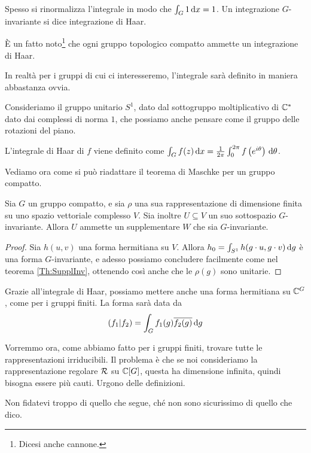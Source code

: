 	Spesso si rinormalizza l'integrale in modo che $\int_{G} 1 \, \textrm{d} x=1$. Un integrazione $G$-invariante si dice integrazione di Haar.
	
	\`E un fatto noto\footnote{Dicesi anche cannone.} che ogni gruppo topologico compatto ammette un integrazione di Haar.
	
	In realtà per i gruppi di cui ci interesseremo, l'integrale sarà definito in maniera abbastanza ovvia.
	
	\begin{myexample}
		Consideriamo il gruppo unitario $S^1$, dato dal sottogruppo moltiplicativo di $\mathbb C^*$ dato dai complessi di norma $1$, che possiamo anche pensare come il gruppo delle rotazioni del piano.
		
		L'integrale di Haar di $f$ viene definito come $\int_{G} f(z) \, \textrm{d} x = \frac1{2\pi}\int_0^{2\pi} f\left(e^{i\theta}\right) \, \textrm{d} \theta$.
	\end{myexample}

	Vediamo ora come si può riadattare il teorema di Maschke per un gruppo compatto.
	
	\begin{mytheorem}
		Sia $G$ un gruppo compatto, e sia $\rho$ una sua rappresentazione di dimensione finita su uno spazio vettoriale complesso $V$. Sia inoltre $U \subseteq V$ un suo sottospazio $G$-invariante. Allora $U$ ammette un supplementare $W$ che sia $G$-invariante.
	\end{mytheorem}
	\begin{proof}
		Sia $h(u,v)$ una forma hermitiana su $V$. Allora $h_0=\int_{S^1} h(g\cdot u, g\cdot v)\, \textrm{d} g$ è una forma $G$-invariante, e adesso possiamo concludere facilmente come nel teorema \ref{Th:SupplInv}, ottenendo così anche che le $\rho(g)$ sono unitarie.  
	\end{proof}
	
	Grazie all'integrale di Haar, possiamo mettere anche una forma hermitiana su $\mathbb C^{G}$, come per i gruppi finiti. La forma sarà data da
	\[
		\left(f_1 | f_2\right) = \int_G f_1(g)\overline{f_2(g)} \, \textrm{d} g 
	\]
	
	Vorremmo ora, come abbiamo fatto per i gruppi finiti, trovare tutte le rappresentazioni irriducibili. Il problema è che se noi consideriamo la rappresentazione regolare $\mathcal R$ su $\mathbb C[G]$, questa ha dimensione infinita, quindi bisogna essere più cauti. Urgono delle definizioni.
	
	\begin{Achtung}
		Non fidatevi troppo di quello che segue, ché non sono sicurissimo di quello che dico.
	\end{Achtung}

